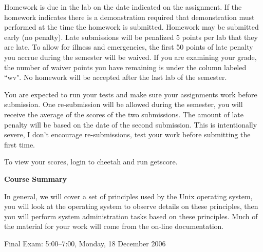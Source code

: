 Homework is due in the lab on the date indicated on the assignment.
If the homework indicates there is a demonstration required
that demonstration must performed at the time the homework is submitted.
Homework may be submitted early (no penalty).
Late submissions will be penalized 5 points per lab that they are late.
To allow for illness and emergencies,
the first 50 points of late penalty you
accrue during the semester will be waived.
If you are examining your grade, the number of waiver points you have
remaining is under the column labeled ``{\ltt{}wv}".
No homework will be accepted after the last lab of the semester.

You are expected to run your tests and make sure your assignments work
before submission.
One re-submission will be allowed during the semester, you will receive
the average of the scores of the two submissions. The amount of late
penalty will be based on the date of the second submission.
This is intentionally severe, I don't encourage re-submissions, test your
work before submitting the first time.

To view your scores, login to {\ltt{}cheetah} and run {\ltt{}getscore}.

\vskip 5pt
\centerline{\bf Course Summary}

In general, we will cover a set of principles used by the Unix operating system,
you will look at the operating system to observe details on these principles,
then you will perform system administration tasks based on these principles.
Much of the material for your work will come from the on-line documentation.

\vskip 5pt
Final Exam: 
5:00--7:00, Monday, 18 December 2006

\def\week#1{\par\hangindent 0.7in {\indent\llap{\bf #1 \enspace}
\ignorespaces}}

\bye
